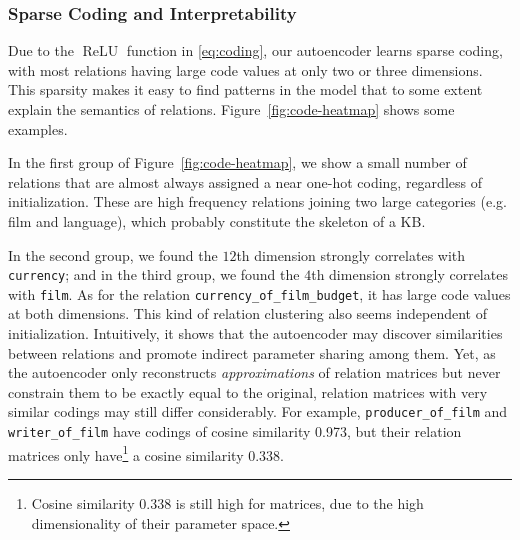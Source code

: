 \documentclass[11pt,a4paper]{article}
\newcommand{\mat}[1]{\bm{#1}}
\renewcommand{\vec}[1]{\bm{#1}}
\DeclareMathOperator*{\relu}{ReLU}
\begin{document}
\subsubsection*{Sparse Coding and Interpretability}\label{sec:interpretability}

Due to the $\relu$ function in \eqref{eq:coding}, our autoencoder learns 
sparse coding, with 
most relations having large code values at only two or three dimensions. 
This sparsity makes it easy to find patterns in the 
model that to some extent explain the semantics of relations.
Figure~\ref{fig:code-heatmap} shows 
some examples. 

In the first group of Figure~\ref{fig:code-heatmap}, we show a small number 
of relations that are almost always assigned a near one-hot coding, 
regardless of initialization. 
These are high frequency relations joining two large categories 
(e.g. film and language), which probably constitute the skeleton of a KB. 

In the second group, we found the $12$th dimension strongly correlates with 
\texttt{currency}; and in the third group, we found the $4$th dimension 
strongly correlates with \texttt{film}. As for the relation 
\texttt{currency\_of\_film\_budget}, it has large code values at both dimensions. 
This kind of relation clustering also seems independent of initialization. 
Intuitively, it shows that the autoencoder may discover similarities 
between relations and 
promote indirect parameter sharing among them. 
Yet, as the autoencoder only reconstructs \emph{approximations} of relation 
matrices but never constrain them to be exactly equal to the original, relation 
matrices with very similar codings may still differ considerably. For 
example, 
\texttt{producer\_of\_film} and \texttt{writer\_of\_film} have
codings of cosine similarity 
0.973, but their relation matrices only 
have\footnote{Cosine similarity 0.338 is still high for matrices, due to the high 
dimensionality of their parameter space.} a 
cosine similarity 0.338. 


\end{document}
